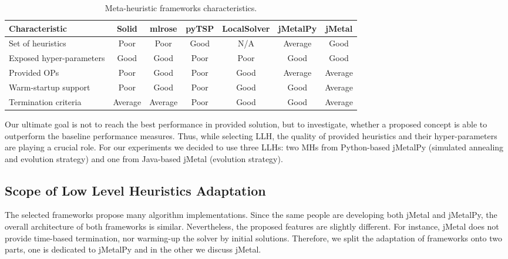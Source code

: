 \begin{table}[h!]
	\centering
	\begin{tabular}{l|cccccc}
		\hline
		\rowcolor{gray!10}
		\textbf{Characteristic} & \textbf{Solid} & \textbf{mlrose} & \textbf{pyTSP} & \textbf{LocalSolver} & \textbf{jMetalPy} & \textbf{jMetal} \\
		\hline
		Set of heuristics & \cellcolor{red!25}Poor & \cellcolor{red!25}Poor & \cellcolor{green!25}Good & N/A & \cellcolor{yellow!25}Average & \cellcolor{green!25}Good \\
		
		Exposed hyper-parameters & \cellcolor{green!25}Good & \cellcolor{green!25}Good & \cellcolor{red!25}Poor & \cellcolor{red!25}Poor & \cellcolor{green!25}Good & \cellcolor{green!25}Good \\
		
		Provided OPs & \cellcolor{red!25}Poor & \cellcolor{green!25}Good & \cellcolor{red!25}Poor & \cellcolor{green!25}Good & \cellcolor{yellow!25}Average & \cellcolor{yellow!25}Average \\
		
		Warm-startup support & \cellcolor{red!25}Poor & \cellcolor{green!25}Good & \cellcolor{red!25}Poor & \cellcolor{green!25}Good & \cellcolor{green!25}Good & \cellcolor{yellow!25}Average \\
		
		Termination criteria & \cellcolor{yellow!25}Average & \cellcolor{yellow!25}Average & \cellcolor{red!25}Poor & \cellcolor{green!25}Good & \cellcolor{green!25}Good & \cellcolor{yellow!25}Average \\
		\hline
	\end{tabular}
	\caption{Meta-heuristic frameworks characteristics.}
	\label{iml: table llh selection}
\end{table}

Our ultimate goal is not to reach the best performance in provided solution, but to investigate, whether a proposed concept is able to outperform the baseline performance measures. Thus, while selecting LLH, the quality of provided heuristics and their hyper-parameters are playing a crucial role. For our experiments we decided to use three LLHs: two MHs from Python-based jMetalPy (simulated annealing and evolution strategy) and one from Java-based jMetal (evolution strategy).


\subsection{Scope of Low Level Heuristics Adaptation}\label{impl: LLH scope}
The selected frameworks propose many algorithm implementations. Since the same people are developing both jMetal and jMetalPy, the overall architecture of both frameworks is similar. Nevertheless, the proposed features are slightly different. For instance, jMetal does not provide time-based termination, nor warming-up the solver by initial solutions. Therefore, we split the adaptation  of frameworks onto two parts, one is dedicated to jMetalPy and in the other we discuss jMetal.

